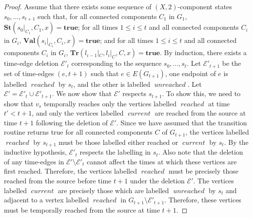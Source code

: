 \documentclass[a4paper,UKenglish,cleveref, autoref, thm-restate]{lipics-v2021} %
\DeclareMathOperator{\reached}{\textit{reached}}
\DeclareMathOperator{\unreached}{\textit{unreached}}
\DeclareMathOperator{\current}{\textit{current}}
\begin{document}
\begin{toappendix}
\begin{proof}
    Assume that there exists some sequence of $(X,2)$-component states $s_0, ..., s_{t+1}$ such that, for all connected components $C_1$ in $G_1$, $\textbf{St}(s_0|_{C_1}, C_1,x)=\textbf{true}$; for all times $1\leq i\leq t$ and all connected components $C_{i}$ in $G_{i}$, $\textbf{Val}(s_{i}|_{C_{i}}, C_{i},x)=\textbf{true}$; and for all times $1\leq i\leq t$ and all connected components $C_{i}$ in $G_{i}$, $\textbf{Tr}(l_{i-1}|_C, l_i|_C, C,x)=\textbf{true}$. By induction, there exists a time-edge deletion $\mathcal{E}'_{t}$ corresponding to the sequence $s_0, ..., s_{t}$. Let $\mathcal{E}'_{t+1}$ be the set of time-edges $(e,t+1)$ such that $e\in E(G_{t+1})$, one endpoint of $e$ is labelled $\reached$ by $s_t$, and the other is labelled $\unreached$. Let $\mathcal{E}'=\mathcal{E}'_t\cup \mathcal{E}'_{t+1}$. We now show that $\mathcal{E}'$ respects $s_{t+1}$. To show this, we need to show that $v_s$ temporally reaches only the vertices labelled $\reached$ at time $t'<t+1$, and only the vertices labelled $\current$ are reached from the source at time $t+1$ following the deletion of $\mathcal{E}'$. Since we have assumed that the transition routine returns true for all connected components $C$ of $G_{t+1}$, the vertices labelled $\reached$ by $s_{t+1}$ must be those labelled either reached or $\current$ by $s_t$. By the inductive hypothesis, $\mathcal{E}'_t$ respects the labelling in $s_t$. Also note that the deletion of any time-edges in $\mathcal{E}'\setminus\mathcal{E}'_{t}$ cannot affect the times at which these vertices are first reached. Therefore, the vertices labelled $\reached$ must be precisely those reached from the source before time $t+1$ under the deletion $\mathcal{E}'$. The vertices labelled $\current$ are precisely those which are labelled $\unreached$ by $s_t$ and adjacent to a vertex labelled $\reached$ in $G_{t+1}\setminus \mathcal{E}'_{t+1}$. Therefore, these vertices must be temporally reached from the source at time $t+1$.


\end{proof}
\end{toappendix}
\end{document}
